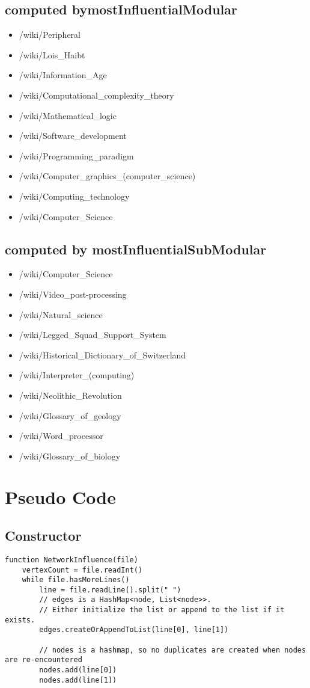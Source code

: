 \documentclass[10pt,letterpaper]{article}
\begin{document}
\subsection{computed bymostInfluentialModular}
\begin{itemize}
\item /wiki/Peripheral
\item /wiki/Lois\_Haibt
\item /wiki/Information\_Age
\item /wiki/Computational\_complexity\_theory
\item /wiki/Mathematical\_logic
\item /wiki/Software\_development
\item /wiki/Programming\_paradigm
\item /wiki/Computer\_graphics\_(computer\_science)
\item /wiki/Computing\_technology
\item /wiki/Computer\_Science
\end{itemize}
\subsection{computed by mostInfluentialSubModular}
\begin{itemize}
\item /wiki/Computer\_Science
\item /wiki/Video\_post-processing
\item /wiki/Natural\_science
\item /wiki/Legged\_Squad\_Support\_System
\item /wiki/Historical\_Dictionary\_of\_Switzerland
\item /wiki/Interpreter\_(computing)
\item /wiki/Neolithic\_Revolution
\item /wiki/Glossary\_of\_geology
\item /wiki/Word\_processor
\item /wiki/Glossary\_of\_biology
\end{itemize}
\section{Pseudo Code}
\subsection{Constructor}
\begin{verbatim}
function NetworkInfluence(file)
    vertexCount = file.readInt()
    while file.hasMoreLines()
        line = file.readLine().split(" ")
        // edges is a HashMap<node, List<node>>.
        // Either initialize the list or append to the list if it exists.
        edges.createOrAppendToList(line[0], line[1])

        // nodes is a hashmap, so no duplicates are created when nodes are re-encountered
        nodes.add(line[0])
        nodes.add(line[1])
\end{verbatim}
\end{document}
